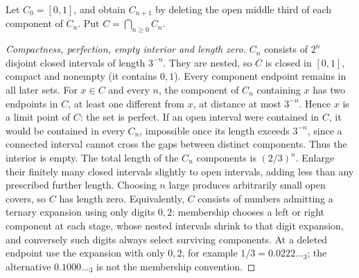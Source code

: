 \begin{construction}
Let $C_0=[0,1]$, and obtain $C_{n+1}$ by deleting the open middle third
of each component of $C_n$. Put $C=\bigcap_{n\ge0}C_n$.
\end{construction}
\begin{proof}[Compactness, perfection, empty interior and length zero]
$C_n$ consists of $2^n$ disjoint closed intervals of length $3^{-n}$.
They are nested, so $C$ is closed in $[0,1]$, compact and nonempty
(it contains $0,1$). Every component endpoint remains in all later sets.
For $x\in C$ and every $n$, the component of $C_n$ containing $x$ has
two endpoints in $C$, at least one different from $x$, at distance at most
$3^{-n}$. Hence $x$ is a limit point of $C$: the set is perfect.
If an open interval were contained in $C$, it would be contained in every
$C_n$, impossible once its length exceeds $3^{-n}$, since a connected
interval cannot cross the gaps between distinct components. Thus the
interior is empty. The total length of the $C_n$ components is $(2/3)^n$.
Enlarge their finitely many closed intervals slightly to open intervals,
adding less than any prescribed further length. Choosing $n$ large
produces arbitrarily small open covers, so $C$ has length zero.
Equivalently, $C$ consists of numbers admitting a ternary expansion using
only digits $0,2$: membership chooses a left or right component at each
stage, whose nested intervals shrink to that digit expansion, and conversely
such digits always select surviving components. At a deleted endpoint
use the expansion with only $0,2$, for example $1/3=0.0222\ldots_3$;
the alternative $0.1000\ldots_3$ is not the membership convention.
\end{proof}

